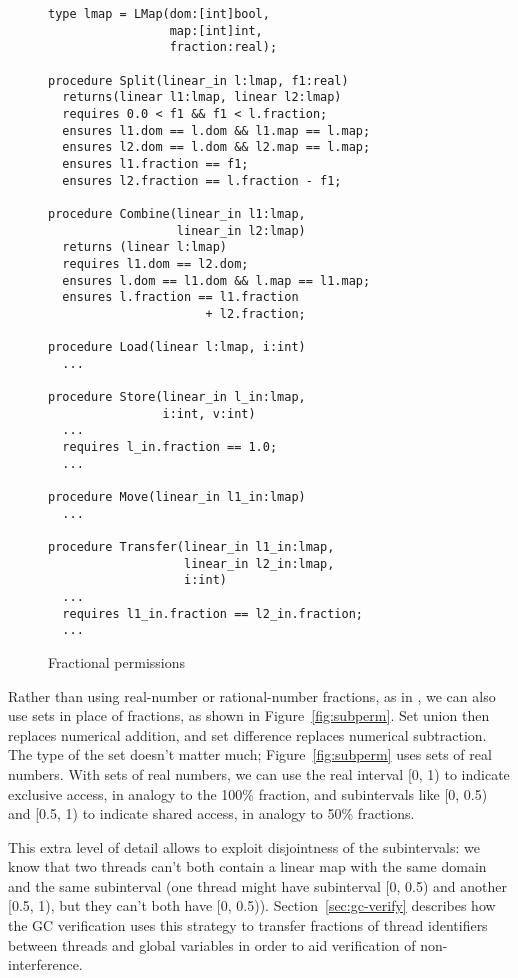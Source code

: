 \begin{figure}
\begin{verbatim}
type lmap = LMap(dom:[int]bool,
                 map:[int]int,
                 fraction:real);

procedure Split(linear_in l:lmap, f1:real)
  returns(linear l1:lmap, linear l2:lmap)
  requires 0.0 < f1 && f1 < l.fraction;
  ensures l1.dom == l.dom && l1.map == l.map;
  ensures l2.dom == l.dom && l2.map == l.map;
  ensures l1.fraction == f1;
  ensures l2.fraction == l.fraction - f1;

procedure Combine(linear_in l1:lmap,
                  linear_in l2:lmap)
  returns (linear l:lmap)
  requires l1.dom == l2.dom;
  ensures l.dom == l1.dom && l.map == l1.map;
  ensures l.fraction == l1.fraction
                      + l2.fraction;

procedure Load(linear l:lmap, i:int) 
  ...

procedure Store(linear_in l_in:lmap,
                i:int, v:int) 
  ...
  requires l_in.fraction == 1.0;
  ...

procedure Move(linear_in l1_in:lmap) 
  ...

procedure Transfer(linear_in l1_in:lmap, 
                   linear_in l2_in:lmap,
                   i:int) 
  ...
  requires l1_in.fraction == l2_in.fraction;
  ...
\end{verbatim}
\caption{Fractional permissions}
\label{fig:fracperm}
\end{figure}

Rather than using real-number or rational-number fractions,
as in \cite{boyland:03fractions},
we can also use sets in place of fractions,
as shown in Figure~\ref{fig:subperm}.
Set union then replaces numerical addition,
and set difference replaces numerical subtraction.
The type of the set doesn't matter much;
Figure~\ref{fig:subperm} uses sets of real numbers.
With sets of real numbers,
we can use the real interval [0, 1) to indicate exclusive access,
in analogy to the 100\% fraction, and subintervals like [0, 0.5) and [0.5, 1)
to indicate shared access, in analogy to 50\% fractions.

This extra level of detail allows \civl to exploit disjointness of the subintervals:
we know that two threads can't both contain a linear map with the same domain and the same subinterval
(one thread might have subinterval [0, 0.5) and another [0.5, 1), but they can't both have [0, 0.5)).
Section~\ref{sec:gc-verify} describes how the GC verification uses this strategy
to transfer fractions of thread identifiers between threads and global variables
in order to aid verification of non-interference.

